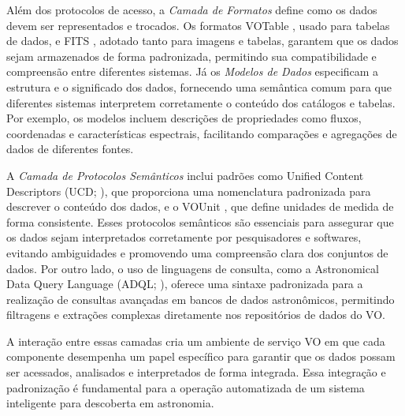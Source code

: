 Além dos protocolos de acesso, a \emph{Camada de Formatos} define como os dados devem ser representados e trocados. Os formatos VOTable \cite{votable}, usado para tabelas de dados, e FITS \cite{fits}, adotado tanto para imagens e tabelas, garantem que os dados sejam armazenados de forma padronizada, permitindo sua compatibilidade e compreensão entre diferentes sistemas. Já os \emph{Modelos de Dados} \cite{vomodel} especificam a estrutura e o significado dos dados, fornecendo uma semântica comum para que diferentes sistemas interpretem corretamente o conteúdo dos catálogos e tabelas. Por exemplo, os modelos incluem descrições de propriedades como fluxos, coordenadas e características espectrais, facilitando comparações e agregações de dados de diferentes fontes.

A \emph{Camada de Protocolos Semânticos} inclui padrões como Unified Content Descriptors (UCD; \citealp{ucd}), que proporciona uma nomenclatura padronizada para descrever o conteúdo dos dados, e o VOUnit \cite{vounit}, que define unidades de medida de forma consistente. Esses protocolos semânticos são essenciais para assegurar que os dados sejam interpretados corretamente por pesquisadores e softwares, evitando ambiguidades e promovendo uma compreensão clara dos conjuntos de dados. Por outro lado, o uso de linguagens de consulta, como a Astronomical Data Query Language (ADQL; \citealp{adql}), oferece uma sintaxe padronizada para a realização de consultas avançadas em bancos de dados astronômicos, permitindo filtragens e extrações complexas diretamente nos repositórios de dados do VO.

A interação entre essas camadas cria um ambiente de serviço VO em que cada componente desempenha um papel específico para garantir que os dados possam ser acessados, analisados e interpretados de forma integrada. Essa integração e padronização é fundamental para a operação automatizada de um sistema inteligente para descoberta em astronomia. %




